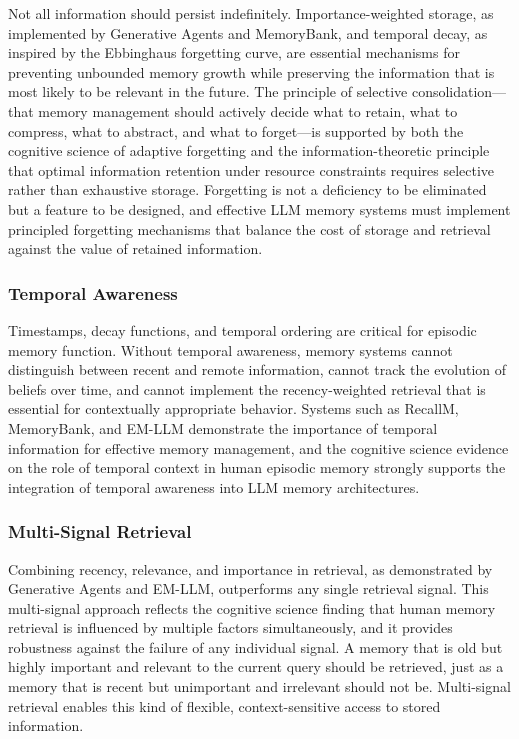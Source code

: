 Not all information should persist indefinitely. Importance-weighted storage, as implemented by Generative Agents and MemoryBank, and temporal decay, as inspired by the Ebbinghaus forgetting curve, are essential mechanisms for preventing unbounded memory growth while preserving the information that is most likely to be relevant in the future. The principle of selective consolidation---that memory management should actively decide what to retain, what to compress, what to abstract, and what to forget---is supported by both the cognitive science of adaptive forgetting and the information-theoretic principle that optimal information retention under resource constraints requires selective rather than exhaustive storage. Forgetting is not a deficiency to be eliminated but a feature to be designed, and effective LLM memory systems must implement principled forgetting mechanisms that balance the cost of storage and retrieval against the value of retained information.

\subsubsection{Temporal Awareness}

Timestamps, decay functions, and temporal ordering are critical for episodic memory function. Without temporal awareness, memory systems cannot distinguish between recent and remote information, cannot track the evolution of beliefs over time, and cannot implement the recency-weighted retrieval that is essential for contextually appropriate behavior. Systems such as RecallM, MemoryBank, and EM-LLM demonstrate the importance of temporal information for effective memory management, and the cognitive science evidence on the role of temporal context in human episodic memory strongly supports the integration of temporal awareness into LLM memory architectures.

\subsubsection{Multi-Signal Retrieval}

Combining recency, relevance, and importance in retrieval, as demonstrated by Generative Agents and EM-LLM, outperforms any single retrieval signal. This multi-signal approach reflects the cognitive science finding that human memory retrieval is influenced by multiple factors simultaneously, and it provides robustness against the failure of any individual signal. A memory that is old but highly important and relevant to the current query should be retrieved, just as a memory that is recent but unimportant and irrelevant should not be. Multi-signal retrieval enables this kind of flexible, context-sensitive access to stored information.

